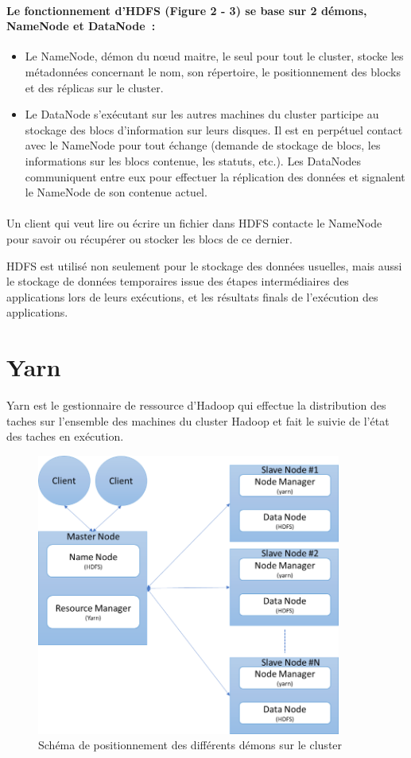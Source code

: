 \documentclass[12pt,french]{book}
\begin{document}
\paragraph{Le fonctionnement d’HDFS (Figure 2 - 3) se base sur 2 démons, NameNode et DataNode :}

\begin{itemize}
	\item
	Le NameNode, démon du nœud maitre, le seul pour tout le cluster, stocke les métadonnées concernant le nom, son répertoire, le positionnement des blocks et des réplicas sur le cluster.
	\item
	Le DataNode s’exécutant sur les autres machines du cluster participe au stockage des blocs d’information sur leurs disques.  Il est en perpétuel contact avec le NameNode pour tout échange (demande de stockage de blocs, les informations sur les blocs contenue, les statuts, etc.).   Les DataNodes communiquent entre eux pour effectuer la réplication des données et signalent le NameNode de son contenue actuel.
\end{itemize}
\paragraph{}
Un client qui veut lire ou écrire un fichier dans HDFS contacte le NameNode pour savoir ou récupérer ou stocker les blocs de ce dernier.

HDFS est utilisé non seulement pour le stockage des données usuelles, mais aussi le stockage de données temporaires issue des étapes intermédiaires des applications lors de leurs exécutions, et les résultats finals de l’exécution des applications.     

\section{Yarn}

Yarn est le gestionnaire de ressource d’Hadoop qui effectue la distribution des taches sur l’ensemble des machines du cluster Hadoop et fait le suivie de l’état des taches en exécution. 

\begin{figure}[ht]
	\centering
	\includegraphics[width=10cm]{demonsSchema}
	\caption{Schéma de positionnement des différents démons sur le cluster}
\end{figure}
\end{document}
